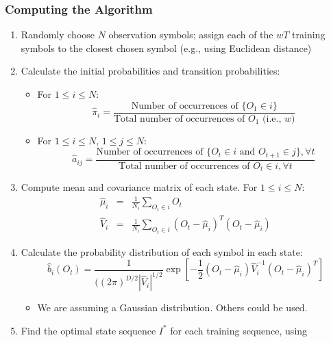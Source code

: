 \documentclass{beamer}
\begin{document}
\begin{frame}[allowframebreaks] \frametitle{Computing the Algorithm}

  \begin{enumerate}
  \item Randomly choose $N$ observation symbols; assign each of the $wT$
    training symbols to the closest chosen symbol (e.g., using Euclidean distance)
  \item Calculate the initial probabilities and transition probabilities:
    \begin{itemize}
    \item For $1 \leq i \leq N$:
      \begin{displaymath}
        \hat{\pi}_i = \frac{ \text{Number of occurrences of $\{O_1 \in i\}$} }
                           { \text{Total number of occurrences of $O_1$ (i.e., $w$)} }
      \end{displaymath}
    \item For $1 \leq i \leq N$, $1 \leq j \leq N$:
      \begin{displaymath}
        \hat{a}_{ij} = \frac{ \text{Number of occurrences of $\{O_t \in i$ and $O_{t+1} \in j\}, \forall t$} }
                           { \text{Total number of occurrences of $O_t \in i, \forall t$} }
      \end{displaymath}
    \end{itemize}
    \label{item:2}
  \item Compute mean and covariance matrix of each state. For $1 \leq i \leq N$:
    \begin{eqnarray*}
      \hat{\mu}_i & = & \frac{1}{N_i}\sum_{O_t \in i} O_t \\
      \hat{V}_i & = & \frac{1}{N_i}\sum_{O_t \in i}(O_t - \hat{\mu}_i)^T(O_t - \hat{\mu}_i)
    \end{eqnarray*}
  \item Calculate the probability distribution of each symbol in each state:
    \begin{displaymath}
      \hat{b}_i(O_t) = \frac{1}{((2\pi)^{D/2}|\hat{V}_i|^{1/2}}
                       \exp[-\frac{1}{2}(O_t-\hat{\mu}_i)\hat{V}_i^{-1}(O_t-\hat{\mu}_i)^T]
    \end{displaymath}
    \begin{itemize}
    \item We are assuming a Gaussian distribution. Others could be used.
    \end{itemize}
  \item Find the optimal state sequence $I^*$ for each training sequence, using

\end{enumerate}
\end{frame}
\end{document}
